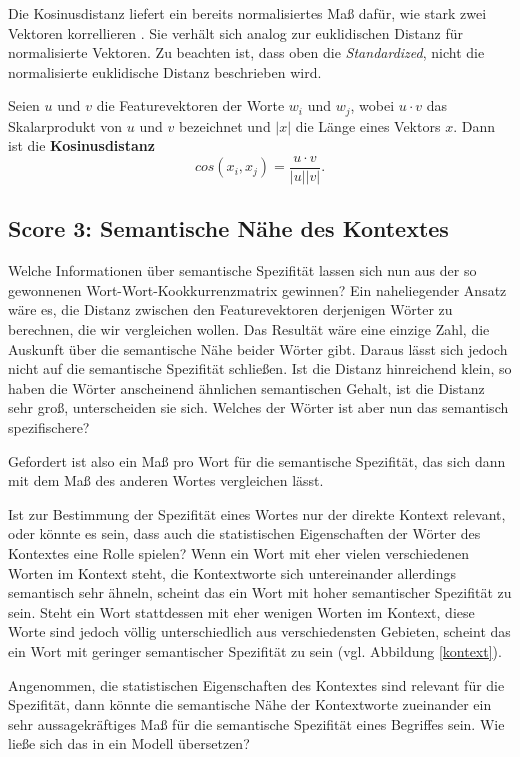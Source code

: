 \documentclass[11pt,numbers=noenddot]{scrartcl}
\begin{document}
Die Kosinusdistanz liefert ein bereits normalisiertes Maß dafür, wie stark zwei Vektoren korrellieren \citep[S. 300]{manning1999}. Sie verhält sich analog zur euklidischen Distanz für normalisierte Vektoren. Zu beachten ist, dass oben die \emph{Standardized}, nicht die normalisierte euklidische Distanz beschrieben wird.

Seien $u$ und $v$ die Featurevektoren der Worte $w_i$ und $w_j$, wobei $u \cdot v$ das Skalarprodukt von $u$ und $v$ bezeichnet und $|x|$ die Länge eines Vektors $x$. Dann ist die \textbf{Kosinusdistanz}
$$
    cos(x_i, x_j) = \frac{u \cdot v}{|u||v|}.
$$

\subsection{Score 3: Semantische Nähe des Kontextes} \label{mdcs}

Welche Informationen über semantische Spezifität lassen sich nun aus der so gewonnenen Wort-Wort-Kookkurrenzmatrix gewinnen? Ein naheliegender Ansatz wäre es, die Distanz zwischen den Featurevektoren derjenigen Wörter zu berechnen, die wir vergleichen wollen. Das Resultät wäre eine einzige Zahl, die Auskunft über die semantische Nähe beider Wörter gibt. Daraus lässt sich jedoch nicht auf die semantische Spezifität schließen. Ist die Distanz hinreichend klein, so haben die Wörter anscheinend ähnlichen semantischen Gehalt, ist die Distanz sehr groß, unterscheiden sie sich. Welches der Wörter ist aber nun das semantisch spezifischere?

Gefordert ist also ein Maß pro Wort für die semantische Spezifität, das sich dann mit dem Maß des anderen Wortes vergleichen lässt.

Ist zur Bestimmung der Spezifität eines Wortes nur der direkte Kontext relevant, oder könnte es sein, dass auch die statistischen Eigenschaften der Wörter des Kontextes eine Rolle spielen? Wenn ein Wort mit eher vielen verschiedenen Worten im Kontext steht, die Kontextworte sich untereinander allerdings semantisch sehr ähneln, scheint das ein Wort mit hoher semantischer Spezifität zu sein. Steht ein Wort stattdessen mit eher wenigen Worten im Kontext, diese Worte sind jedoch völlig unterschiedlich aus verschiedensten Gebieten, scheint das ein Wort mit geringer semantischer Spezifität zu sein (vgl. Abbildung \ref{kontext}).

Angenommen, die statistischen Eigenschaften des Kontextes sind relevant für die Spezifität, dann könnte die semantische Nähe der Kontextworte zueinander ein sehr aussagekräftiges Maß für die semantische Spezifität eines Begriffes sein. Wie ließe sich das in ein Modell übersetzen?
\end{document}
